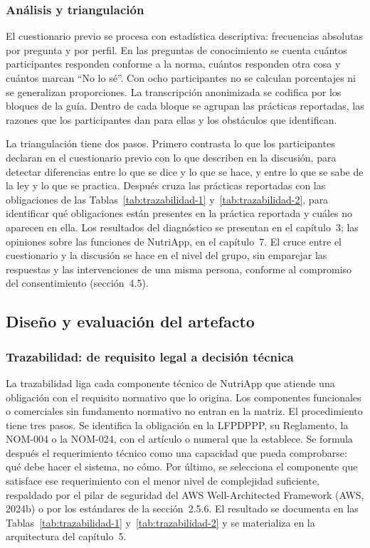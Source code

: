\documentclass[12pt, a4paper]{article}
\begin{document}
\subsubsection{Análisis y triangulación}
 
El cuestionario previo se procesa con estadística descriptiva:
frecuencias absolutas por pregunta y por perfil. En las preguntas de
conocimiento se cuenta cuántos participantes responden conforme a la
norma, cuántos responden otra cosa y cuántos marcan ``No lo sé''. Con ocho
participantes no se calculan porcentajes ni se generalizan proporciones.
La transcripción anonimizada se codifica por los bloques de la guía.
Dentro de cada bloque se agrupan las prácticas reportadas, las razones
que los participantes dan para ellas y los obstáculos que identifican.
 
La triangulación tiene dos pasos. Primero contrasta lo que los
participantes declaran en el cuestionario previo con lo que describen en
la discusión, para detectar diferencias entre lo que se dice y lo que se
hace, y entre lo que se sabe de la ley y lo que se practica. Después
cruza las prácticas reportadas con las obligaciones de las
Tablas~\ref{tab:trazabilidad-1} y~\ref{tab:trazabilidad-2}, para
identificar qué obligaciones están presentes en la práctica reportada y
cuáles no aparecen en ella. Los resultados del diagnóstico se presentan en el capítulo~3;
las opiniones sobre las funciones de NutriApp, en el capítulo~7. El
cruce entre el cuestionario y la discusión se hace en el nivel del
grupo, sin emparejar las respuestas y las intervenciones de una misma
persona, conforme al compromiso del consentimiento (sección~4.5).
 
\subsection{Diseño y evaluación del artefacto}
 
\subsubsection{Trazabilidad: de requisito legal a decisión técnica}
 
La trazabilidad liga cada componente técnico de NutriApp que atiende una
obligación con el requisito normativo que lo origina. Los componentes
funcionales o comerciales sin fundamento normativo no entran en la
matriz. El procedimiento tiene tres pasos. Se identifica
la obligación en la LFPDPPP, su Reglamento, la NOM-004 o la NOM-024,
con el artículo o numeral que la establece. Se formula después el
requerimiento técnico como una capacidad que pueda comprobarse: qué
debe hacer el sistema, no cómo. Por último, se selecciona el componente
que satisface ese requerimiento con el menor nivel de complejidad
suficiente, respaldado por el pilar de seguridad del AWS
Well-Architected Framework (AWS, 2024b) o por los estándares de la
sección~2.5.6. El resultado se
documenta en las Tablas~\ref{tab:trazabilidad-1}
y~\ref{tab:trazabilidad-2} y se materializa en la arquitectura del
capítulo~5.
 
\end{document}
